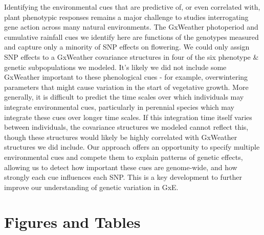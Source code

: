 \documentclass[
  9pt,
  twocolumn,
  twoside]{pnas-new}
\begin{document}
Identifying the environmental cues that are predictive of, or even
correlated with, plant phenotypic responses remains a major challenge to
studies interrogating gene action across many natural environments. The
GxWeather photoperiod and cumulative rainfall cues we identify here are
functions of the genotypes measured and capture only a minority of SNP
effects on flowering. We could only assign SNP effects to a GxWeather
covariance structures in four of the six phenotype \& genetic
subpopulations we modeled. It's likely we did not include some GxWeather
important to these phenological cues - for example, overwintering
parameters that might cause variation in the start of vegetative growth.
More generally, it is difficult to predict the time scales over which
individuals may integrate environmental cues, particularly in perennial
species which may integrate these cues over longer time scales. If this
integration time itself varies between individuals, the covariance
structures we modeled cannot reflect this, though these structures would
likely be highly correlated with GxWeather structures we did include.
Our approach offers an opportunity to specify multiple environmental
cues and compete them to explain patterns of genetic effects, allowing
us to detect how important these cues are genome-wide, and how strongly
each cue influences each SNP. This is a key development to further
improve our understanding of genetic variation in GxE.

\section{Figures and Tables}\label{figures-and-tables}
\end{document}
